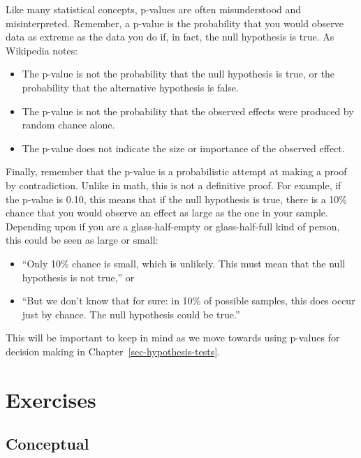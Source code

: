 \documentclass[
  letterpaper,
  DIV=11,
  numbers=noendperiod]{scrreprt}
\providecommand{\tightlist}{%
  \setlength{\itemsep}{0pt}\setlength{\parskip}{0pt}}\usepackage{longtable,booktabs,array}
\theoremstyle{definition}
\theoremstyle{remark}
\begin{document}
Like many statistical concepts, p-values are often misunderstood and
misinterpreted. Remember, a p-value is the probability that you would
observe data as extreme as the data you do if, in fact, the null
hypothesis is true. As Wikipedia notes:

\begin{itemize}
\tightlist
\item
  The p-value is not the probability that the null hypothesis is true,
  or the probability that the alternative hypothesis is false.
\item
  The p-value is not the probability that the observed effects were
  produced by random chance alone.
\item
  The p-value does not indicate the size or importance of the observed
  effect.
\end{itemize}

Finally, remember that the p-value is a probabilistic attempt at making
a proof by contradiction. Unlike in math, this is not a definitive
proof. For example, if the p-value is 0.10, this means that if the null
hypothesis is true, there is a 10\% chance that you would observe an
effect as large as the one in your sample. Depending upon if you are a
glass-half-empty or glass-half-full kind of person, this could be seen
as large or small:

\begin{itemize}
\tightlist
\item
  ``Only 10\% chance is small, which is unlikely. This must mean that
  the null hypothesis is not true,'' or
\item
  ``But we don't know that for sure: in 10\% of possible samples, this
  does occur just by chance. The null hypothesis could be true.''
\end{itemize}

This will be important to keep in mind as we move towards using p-values
for decision making in Chapter~\ref{sec-hypothesis-tests}.

\hypertarget{sec-ex11}{%
\section{Exercises}\label{sec-ex11}}

\hypertarget{sec-ex11-conceptual}{%
\subsection{Conceptual}\label{sec-ex11-conceptual}}
\end{document}
